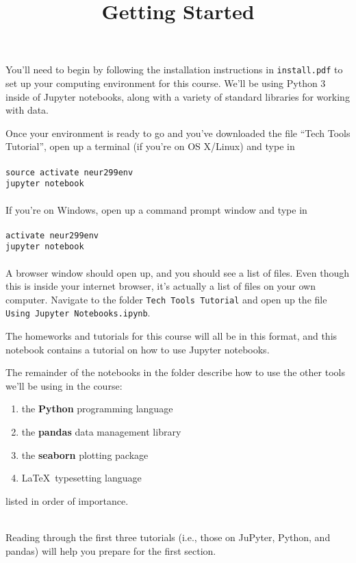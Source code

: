 \documentclass[twoside]{article}
\title{Getting Started}
\date{}
\author{}
\begin{document}
\maketitle

You'll need to begin by following the installation instructions in
\texttt{install.pdf}
to set up your computing environment for this course.
We'll be using Python 3 inside of Jupyter notebooks,
along with a variety of standard libraries for working with data.

Once your environment is ready to go
and you've downloaded
the file ``Tech Tools Tutorial'',
open up a terminal (if you're on OS X/Linux)
and type in
\\ \\
\texttt{source activate neur299env}
\\
\texttt{jupyter notebook}
\\ \\
If you're on Windows, open up a
command prompt window
and type in
\\ \\
\texttt{activate neur299env}
\\
\texttt{jupyter notebook}
\\ \\
A browser window should open up, and you should see a list of files.
Even though this is inside your internet browser,
it's actually a list of files on your own computer.
Navigate to the folder \texttt{Tech Tools Tutorial}
and open up the file
\texttt{Using Jupyter Notebooks.ipynb}.

The homeworks and tutorials for this course will all be in this format,
and this notebook contains a tutorial on how to use Jupyter notebooks.

The remainder of the notebooks in the folder describe how
to use the other tools we'll be using in the course:

\begin{enumerate}
\item the \textbf{Python} programming language
\item the \textbf{pandas} data management library
\item the \textbf{seaborn} plotting package
\item \LaTeX \ typesetting language
\end{enumerate}

listed in order of importance.

\ \\

Reading through the first three tutorials
(i.e., those on JuPyter, Python, and pandas)
will help you prepare for the first section.
\end{document}

